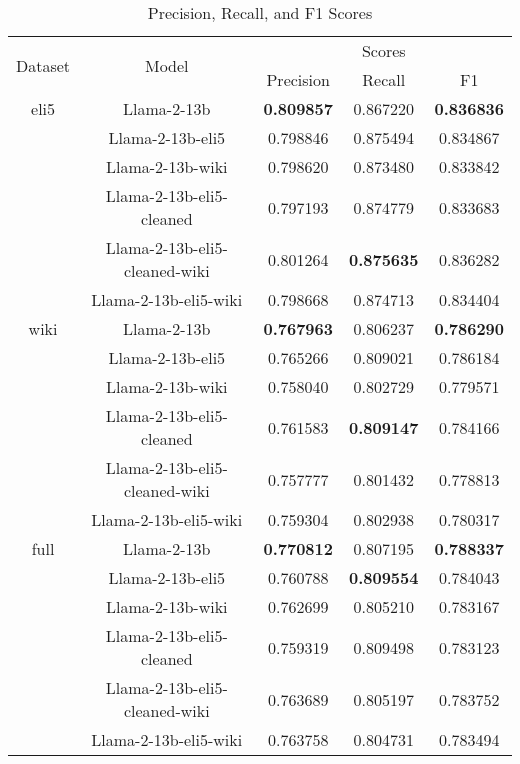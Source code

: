 \documentclass[11pt, oneside]{article}   	%
\begin{document}
\begin{table}
\centering
\caption{Precision, Recall, and F1 Scores}
\label{tab:scores}
\begin{tabular}{ccccc}
\toprule
\multirow{2}{*}{Dataset} & \multirow{2}{*}{Model} & \multicolumn{3}{c}{Scores} \\
& & Precision & Recall & F1 \\
\midrule
eli5 & Llama-2-13b & \textbf{0.809857} & 0.867220 & \textbf{0.836836} \\
 & Llama-2-13b-eli5 & 0.798846 & 0.875494 & 0.834867 \\
 & Llama-2-13b-wiki & 0.798620 & 0.873480 & 0.833842 \\
 & Llama-2-13b-eli5-cleaned & 0.797193 & 0.874779 & 0.833683 \\
 & Llama-2-13b-eli5-cleaned-wiki & 0.801264 & \textbf{0.875635} & 0.836282 \\
 & Llama-2-13b-eli5-wiki & 0.798668 & 0.874713 & 0.834404 \\
 \midrule
wiki & Llama-2-13b & \textbf{0.767963} & 0.806237 & \textbf{0.786290} \\
 & Llama-2-13b-eli5 & 0.765266 & 0.809021 & 0.786184 \\
 & Llama-2-13b-wiki & 0.758040 & 0.802729 & 0.779571 \\
 & Llama-2-13b-eli5-cleaned & 0.761583 & \textbf{0.809147} & 0.784166 \\
 & Llama-2-13b-eli5-cleaned-wiki & 0.757777 & 0.801432 & 0.778813 \\
 & Llama-2-13b-eli5-wiki & 0.759304 & 0.802938 & 0.780317 \\
\midrule
full & Llama-2-13b & \textbf{0.770812} & 0.807195 & \textbf{0.788337} \\
 & Llama-2-13b-eli5 & 0.760788 & \textbf{0.809554} & 0.784043 \\
 & Llama-2-13b-wiki & 0.762699 & 0.805210 & 0.783167 \\
 & Llama-2-13b-eli5-cleaned & 0.759319 & 0.809498 & 0.783123 \\
 & Llama-2-13b-eli5-cleaned-wiki & 0.763689 & 0.805197 & 0.783752 \\
 & Llama-2-13b-eli5-wiki & 0.763758 & 0.804731 & 0.783494 \\
\bottomrule
\end{tabular}
\end{table}
\end{document}
